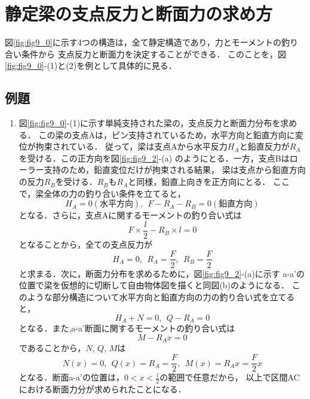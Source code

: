 \documentclass[10pt,a4j]{jarticle}
\begin{document}
\section{静定梁の支点反力と断面力の求め方}
図\ref{fig:fig9_0}に示す4つの構造は，全て静定構造であり，力とモーメントの釣り合い条件から
支点反力と断面力を決定することができる．
このことを，図\ref{fig:fig9_0}-(1)と(2)を例として具体的に見る．
\subsection{例題}
\begin{enumerate}
\item
図\ref{fig:fig9_0}-(1)に示す単純支持された梁の，支点反力と断面力分布を求める．
この梁の支点Aは，ピン支持されているため，水平方向と鉛直方向に変位が拘束されている．
従って，梁は支点Aから水平反力$H_A$と鉛直反力が$R_A$を受ける．この正方向を図\ref{fig:fig9_2}-(a)
のようにとる．一方，支点Bはローラー支持のため，鉛直変位だけが拘束される結果，
梁は支点から鉛直方向の反力$R_B$を受ける．$R_B$も$R_A$と同様，鉛直上向きを正方向にとる．
ここで，梁全体の力の釣り合い条件を立てると，
\begin{equation}
	H_A=0(水平方向), \ \ 
	F-R_A-R_B=0(鉛直方向)
	\label{eqn:}
\end{equation}
となる．さらに，支点Aに関するモーメントの釣り合い式は
\begin{equation}
	F\times \frac{l}{2}-R_B\times l =0
	\label{eqn:}
\end{equation}
となることから，全ての支点反力が
\begin{equation}
	H_A=0, \ \ R_A=\frac{F}{2}, \ \ R_B=\frac{F}{2}
	\label{eqn:}
\end{equation}
と求まる．次に，断面力分布を求めるために，図\ref{fig:fig9_2}-(a)に示す
a-a'の位置で梁を仮想的に切断して自由物体図を描くと同図(b)のようになる．
このような部分構造について水平方向と鉛直方向の力の釣り合い式を立てると，
\begin{equation}
	H_A+N=0, \ \ Q-R_A=0
	\label{eqn:}
\end{equation}
となる．また,a-a'断面に関するモーメントの釣り合い式は
\begin{equation}
	M-R_A x=0
	\label{eqn:}
\end{equation}
であることから，$N,\, Q,\, M$は
\begin{equation}
	N(x)=0,\ \ Q(x)=R_A=\frac{F}{2}, \ \ 
	M(x)= R_Ax =\frac{F}{2}x
	\label{eqn:}
\end{equation}
となる．断面a-a'の位置は，$0< x< \frac{l}{2}$の範囲で任意だから，
以上で区間ACにおける断面力分が求められたことになる．

\end{enumerate}
\end{document}
